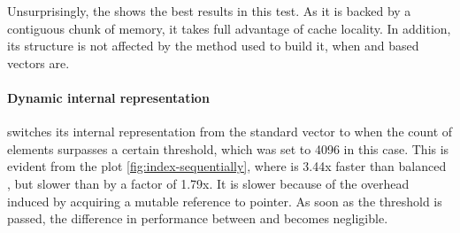     
    
    
    


Unsurprisingly, the \stdvec{} shows the best results in this test. As it is backed by a contiguous chunk of memory, it takes full advantage of cache locality. In addition, its structure is not affected by the method used to build it, when \rbtree{} and \rrbtree{} based vectors are. 

\paragraph{Dynamic internal representation}

\pvec{} switches its internal representation from the standard vector to \rrbvec{} when the count of elements surpasses a certain threshold, which was set to 4096 in this case. This is evident from the plot \ref{fig:index-sequentially}, where \pvec{} is 3.44x faster than balanced \rrbvec{}, but slower than \stdvec{} by a factor of 1.79x. It is slower because of the overhead induced by acquiring a mutable reference to \rc{} pointer. As soon as the threshold is passed, the difference in performance between \pvec{} and \rrbvec{} becomes negligible. 


